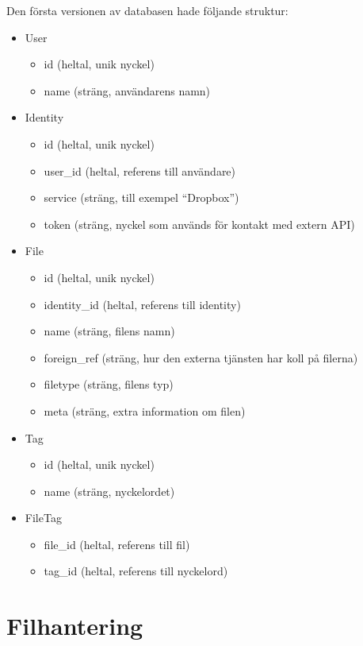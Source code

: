 Den första versionen av databasen hade följande struktur:
\begin{itemize}
\item User
  \begin{itemize}
    \item id (heltal, unik nyckel)
    \item name (sträng, användarens namn)
  \end{itemize}
\item Identity
  \begin{itemize}
    \item id (heltal, unik nyckel)
    \item user\_id (heltal, referens till användare)
    \item service (sträng, till exempel “Dropbox”)
    \item token (sträng, nyckel som används för kontakt med extern API)
  \end{itemize}
\item File
  \begin{itemize}
    \item id (heltal, unik nyckel)
    \item identity\_id (heltal, referens till identity)
    \item name (sträng, filens namn)
    \item foreign\_ref (sträng, hur den externa tjänsten har koll på filerna)
    \item filetype (sträng, filens typ)
    \item meta (sträng, extra information om filen)
  \end{itemize}
\item Tag
  \begin{itemize}
    \item id (heltal, unik nyckel)
    \item name (sträng, nyckelordet)
  \end{itemize}
\item FileTag
  \begin{itemize}
    \item file\_id (heltal, referens till fil)
    \item tag\_id (heltal, referens till nyckelord)
  \end{itemize}
\end{itemize}

\section{Filhantering}

